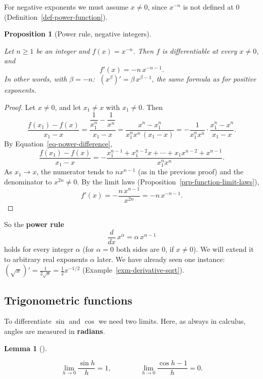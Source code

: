 \documentclass[
  letterpaper,
  DIV=11,
  numbers=noendperiod]{scrreprt}
\theoremstyle{plain}
\newtheorem{lemma}{Lemma}[chapter]
\theoremstyle{plain}
\newtheorem{proposition}{Proposition}[chapter]
\theoremstyle{definition}
\theoremstyle{definition}
\theoremstyle{definition}
\theoremstyle{plain}
\theoremstyle{plain}
\theoremstyle{remark}
\begin{document}
For negative exponents we must assume \(x\neq 0\), since \(x^{-n}\) is
not defined at \(0\) (Definition~\ref{def-power-function}).

\begin{proposition}[Power rule, negative
integers]\protect\hypertarget{prp-power-rule-negative}{}\label{prp-power-rule-negative}

Let \(n\ge1\) be an integer and \(f(x)=x^{-n}\). Then \(f\) is
differentiable at every \(x\neq0\), and \[
f'(x) = -n\,x^{-n-1}.
\] In other words, with \(\beta=-n\):
\(\;(x^\beta)' = \beta\,x^{\beta-1}\), the same formula as for positive
exponents.

\end{proposition}

\begin{proof}
Let \(x\neq 0\), and let \(x_1\neq x\) with \(x_1\neq 0\). Then \[
\frac{f(x_1)-f(x)}{x_1-x} = \frac{\dfrac{1}{x_1^n}-\dfrac{1}{x^n}}{x_1-x}
= \frac{x^n-x_1^n}{x_1^n x^n\,(x_1-x)}
= -\frac{1}{x_1^nx^n}\cdot\frac{x_1^n-x^n}{x_1-x}.
\] By Equation~\ref{eq-power-difference}, \[
\frac{f(x_1)-f(x)}{x_1-x}
= -\frac{x_1^{n-1} + x_1^{n-2}x + \cdots + x_1x^{n-2} + x^{n-1}}{x_1^n x^n}.
\] As \(x_1\to x\), the numerator tends to \(n x^{n-1}\) (as in the
previous proof) and the denominator to \(x^{2n}\neq0\). By the limit
laws (Proposition~\ref{prp-function-limit-laws}), \[
f'(x) = -\frac{n\,x^{n-1}}{x^{2n}} = -n\,x^{-n-1}.
\]
\end{proof}

So the \textbf{power rule} \[
\frac{d}{dx}\,x^\alpha = \alpha\, x^{\alpha-1}
\] holds for every integer \(\alpha\) (for \(\alpha=0\) both sides are
\(0\), if \(x\neq0\)). We will extend it to arbitrary real exponents
\(\alpha\) later. We have already seen one instance:
\((\sqrt x)' = \frac{1}{2\sqrt x} = \frac12 x^{-1/2}\)
(Example~\ref{exm-derivative-sqrt}).

\subsection{Trigonometric functions}\label{trigonometric-functions-1}

To differentiate \(\sin\) and \(\cos\) we need two limits. Here, as
always in calculus, angles are measured in \textbf{radians}.

\begin{lemma}[]\protect\hypertarget{lem-trig-limits}{}\label{lem-trig-limits}

\hfill\break
\[
\lim_{h\to0}\frac{\sin h}{h} = 1, \qquad\qquad \lim_{h\to0}\frac{\cos h - 1}{h} = 0.
\]

\end{lemma}
\end{document}
